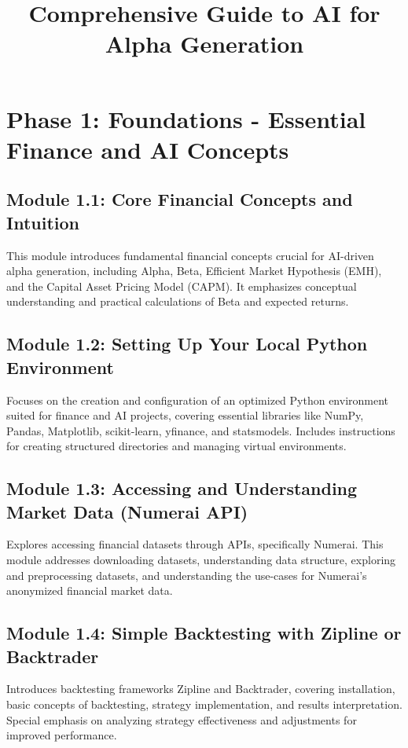 \documentclass{article}
\begin{document}
\title{Comprehensive Guide to AI for Alpha Generation}
\author{}
\date{}
\maketitle

\section{Phase 1: Foundations - Essential Finance and AI Concepts}

\subsection{Module 1.1: Core Financial Concepts and Intuition}
This module introduces fundamental financial concepts crucial for AI-driven alpha generation, including Alpha, Beta, Efficient Market Hypothesis (EMH), and the Capital Asset Pricing Model (CAPM). It emphasizes conceptual understanding and practical calculations of Beta and expected returns.

\subsection{Module 1.2: Setting Up Your Local Python Environment}
Focuses on the creation and configuration of an optimized Python environment suited for finance and AI projects, covering essential libraries like NumPy, Pandas, Matplotlib, scikit-learn, yfinance, and statsmodels. Includes instructions for creating structured directories and managing virtual environments.

\subsection{Module 1.3: Accessing and Understanding Market Data (Numerai API)}
Explores accessing financial datasets through APIs, specifically Numerai. This module addresses downloading datasets, understanding data structure, exploring and preprocessing datasets, and understanding the use-cases for Numerai's anonymized financial market data.

\subsection{Module 1.4: Simple Backtesting with Zipline or Backtrader}
Introduces backtesting frameworks Zipline and Backtrader, covering installation, basic concepts of backtesting, strategy implementation, and results interpretation. Special emphasis on analyzing strategy effectiveness and adjustments for improved performance.
\end{document}
